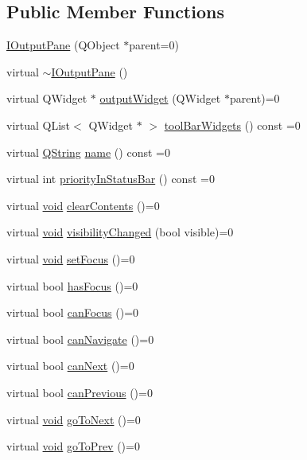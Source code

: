 \subsection*{\-Public \-Member \-Functions}
\begin{DoxyCompactItemize}
\item 
\hyperlink{group___core_plugin_ga47a14795596f88e7b26b737cb94e4348}{\-I\-Output\-Pane} (\-Q\-Object $\ast$parent=0)
\item 
virtual \hyperlink{group___core_plugin_ga74f2026df82773bb5ed94226666b641e}{$\sim$\-I\-Output\-Pane} ()
\item 
virtual \-Q\-Widget $\ast$ \hyperlink{group___core_plugin_ga99cb40dfe9b8625932283775e1edb2ba}{output\-Widget} (\-Q\-Widget $\ast$parent)=0
\item 
virtual \-Q\-List$<$ \-Q\-Widget $\ast$ $>$ \hyperlink{group___core_plugin_ga6086193af6e059b86451cd5a3c0d2373}{tool\-Bar\-Widgets} () const =0
\item 
virtual \hyperlink{group___u_a_v_objects_plugin_gab9d252f49c333c94a72f97ce3105a32d}{\-Q\-String} \hyperlink{group___core_plugin_ga1504ed1816cbdb3458ff3439f6355d49}{name} () const =0
\item 
virtual int \hyperlink{group___core_plugin_ga46b89bfb71ca90a47531ec5536d50075}{priority\-In\-Status\-Bar} () const =0
\item 
virtual \hyperlink{group___u_a_v_objects_plugin_ga444cf2ff3f0ecbe028adce838d373f5c}{void} \hyperlink{group___core_plugin_ga0450bf70f518ec784c29d9d4f7a1ed3b}{clear\-Contents} ()=0
\item 
virtual \hyperlink{group___u_a_v_objects_plugin_ga444cf2ff3f0ecbe028adce838d373f5c}{void} \hyperlink{group___core_plugin_ga3128a309873592d64cddf36d88f76856}{visibility\-Changed} (bool visible)=0
\item 
virtual \hyperlink{group___u_a_v_objects_plugin_ga444cf2ff3f0ecbe028adce838d373f5c}{void} \hyperlink{group___core_plugin_ga3f018a7b33734836caaf6d26346d2847}{set\-Focus} ()=0
\item 
virtual bool \hyperlink{group___core_plugin_ga53b719828a92b5466b432ee47cf9961e}{has\-Focus} ()=0
\item 
virtual bool \hyperlink{group___core_plugin_ga181d2716dd1a399a31c2db4e4c57f2cb}{can\-Focus} ()=0
\item 
virtual bool \hyperlink{group___core_plugin_ga955964e740f01e5750466e0d9a94b6a8}{can\-Navigate} ()=0
\item 
virtual bool \hyperlink{group___core_plugin_gaf443b3346efc59338b4a21e97b800111}{can\-Next} ()=0
\item 
virtual bool \hyperlink{group___core_plugin_gab8f58bb62f6ebcb98768447471cfe21c}{can\-Previous} ()=0
\item 
virtual \hyperlink{group___u_a_v_objects_plugin_ga444cf2ff3f0ecbe028adce838d373f5c}{void} \hyperlink{group___core_plugin_ga2ddbd6616a138d34c937f59ece4c3118}{go\-To\-Next} ()=0
\item 
virtual \hyperlink{group___u_a_v_objects_plugin_ga444cf2ff3f0ecbe028adce838d373f5c}{void} \hyperlink{group___core_plugin_ga292b3bbe41d455040928fab85b78c79d}{go\-To\-Prev} ()=0
\end{DoxyCompactItemize}


